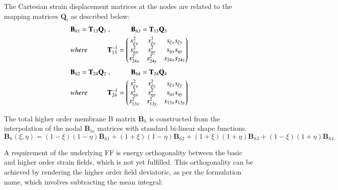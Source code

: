 The Cartesian strain displacement matrices at the nodes are related to the mapping matrices $\mathbf{Q}_i$ as described below:
\begin{gather} 
	\begin{aligned}
		&\mathbf{B}_{h1} = \mathbf{T}_{13}  \mathbf{Q}_{1}\ ,
		\hspace{10mm}
		\mathbf{B}_{h3} = \mathbf{T}_{13}  \mathbf{Q}_{3}\\
		&where 
		\hspace{10mm} 
		\mathbf{T}_{13}^{-1} =
		\begin{pmatrix}
			s_{\xi x}^2 & s_{\xi y}^2 & s_{\xi x} s_{\xi y} \\
			s_{\eta x}^2 & s_{\eta y}^2 & s_{\eta x} s_{\eta y} \\
			s_{24 x}^2 & s_{24 y}^2 & s_{24 x} s_{24 y}
		\end{pmatrix}
		\label{equation17}
	\end{aligned}
\end{gather}
\begin{gather} 
	\begin{aligned}
		&\mathbf{B}_{h2} = \mathbf{T}_{24}  \mathbf{Q}_{2}\ ,
		\hspace{10mm}
		\mathbf{B}_{h4} = \mathbf{T}_{24}  \mathbf{Q}_{4}\\
		&where 
		\hspace{10mm} 
		\mathbf{T}_{24}^{-1} =
		\begin{pmatrix}
			s_{\xi x}^2 & s_{\xi y}^2 & s_{\xi x} s_{\xi y} \\
			s_{\eta x}^2 & s_{\eta y}^2 & s_{\eta x} s_{\eta y} \\
			s_{13 x}^2 & s_{13 y}^2 & s_{13 x} s_{13 y}
		\end{pmatrix}
		\label{equation18}
	\end{aligned}
\end{gather}

The total higher order membrane B matrix $\mathbf{B}_h$ is constructed from the interpolation of the nodal $\mathbf{B}_{hi}$ matrices with standard bi-linear shape functions.
\begin{equation} 
\mathbf{B}_h(\xi,\eta) = (1-\xi)(1-\eta)\mathbf{B}_{h1} + (1+\xi)(1-\eta)\mathbf{B}_{h2} + (1+\xi)(1+\eta)\mathbf{B}_{h3} +	(1-\xi)(1+\eta)\mathbf{B}_{h4} 
\label{equation19}
\end{equation}

A requirement of the underlying FF is energy orthogonality between the basic and higher order strain fields, which is not yet fulfilled. This orthogonality can be achieved by rendering the higher order field deviatoric, as per the formulation name, which involves subtracting the mean integral:

